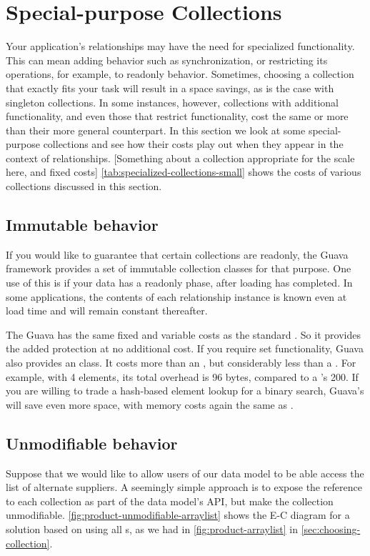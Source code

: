 \section{Special-purpose Collections}
Your application's relationships may have the need for
specialized functionality.  This can mean adding behavior such as
synchronization, or restricting its operations, for example, to readonly
behavior.
Sometimes, choosing a collection that exactly fits your task will result in a space
savings, as is the case with singleton collections. In some instances, however,
collections with additional functionality, and even those that restrict
functionality, cost the same or more than their more general counterpart. 
In this section we look at some special-purpose collections and see how
their costs play out when they appear in the context of relationships. 
[Something about a collection appropriate for the scale here, and fixed costs]
\autoref{tab:specialized-collections-small} shows
the costs of various collections discussed in this section.

\subsection{Immutable behavior}
\label{sec:immutable-collections}
If you would like to guarantee that certain collections are readonly, the Guava
framework provides a set of immutable collection classes for that
purpose. One use of this is if your data has a readonly phase, after loading has
completed.
In some applications, the contents of each relationship
instance is known even at load time and will remain constant thereafter.  

The Guava  has the same fixed and variable costs as the
standard . So it provides the
added protection at no additional cost.  If you require set functionality,
Guava also provides an  class. It costs more than an
, but considerably less than a .
For example, with 4 elements, its total overhead is 96 bytes, compared to
a 's 200. If you are willing to trade a hash-based element
lookup for a binary search, Guava's  will save even
more space, with memory costs again the same as .

\subsection{Unmodifiable behavior}
\label{sec:unmodifiable-collections}
Suppose that we would like to allow users of our data model to be able access
the list of alternate suppliers. A seemingly simple approach is to expose the
reference to each collection as part of the data model's API, but make
the collection unmodifiable. \autoref{fig:product-unmodifiable-arraylist} shows
the E-C diagram for a solution based on using all s, as we had in
\autoref{fig:product-arraylist} in \autoref{sec:choosing-collection}.

